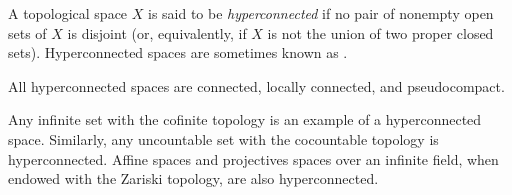 \documentclass[12pt]{article}
\begin{document}

A topological space $X$ is said to be \emph{hyperconnected} if no pair of nonempty open sets of $X$ is disjoint (or, equivalently, if $X$ is not the union of two proper closed sets).
Hyperconnected spaces are sometimes known as .

All hyperconnected spaces are connected, locally connected, and pseudocompact.

Any infinite set with the cofinite topology is an example of a hyperconnected space.
Similarly, any uncountable set with the cocountable topology is hyperconnected.
Affine spaces and projectives spaces over an infinite field, when endowed with the Zariski topology, are also hyperconnected.
\end{document}
